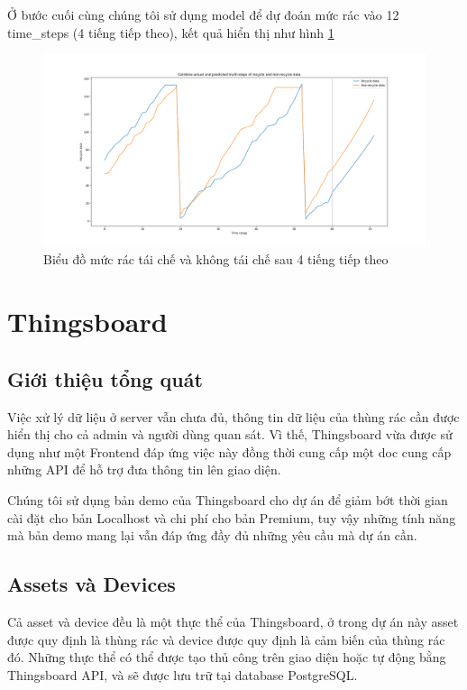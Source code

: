 Ở bước cuối cùng chúng tôi sử dụng model để dự đoán mức rác vào 12 time\_steps (4 tiếng tiếp theo), kết quả hiển thị như hình \ref{fig:final_result}
\begin{figure}[H]
    \centering
    \includegraphics[width=\textwidth]{images/Khanh/Python/Final_results.png}
    \caption{Biểu đồ mức rác tái chế và không tái chế sau 4 tiếng tiếp theo}
    \label{fig:final_result}
\end{figure}

\section{Thingsboard}
\subsection{Giới thiệu tổng quát}
Việc xử lý dữ liệu ở server vẫn chưa đủ, thông tin dữ liệu của thùng rác cần được hiển thị cho cả admin và người dùng quan sát. Vì thế, Thingsboard vừa được sử dụng như một Frontend đáp ứng việc này đồng thời cung cấp một doc cung cấp những API để hỗ trợ đưa thông tin lên giao diện.

Chúng tôi sử dụng bản demo của Thingsboard cho dự án để giảm bớt thời gian cài đặt cho bản Localhost và chi phí cho bản Premium, tuy vậy những tính năng mà bản demo mang lại vẫn đáp ứng đầy đủ những yêu cầu mà dự án cần. 

\subsection{Assets và Devices}
Cả asset và device đều là một thực thể của Thingsboard, ở trong dự án này asset được quy định là thùng rác và device được quy định là cảm biến của thùng rác đó. Những thực thể có thể được tạo thủ công trên giao diện hoặc tự động bằng Thingsboard API, và sẽ được lưu trữ tại database PostgreSQL.

